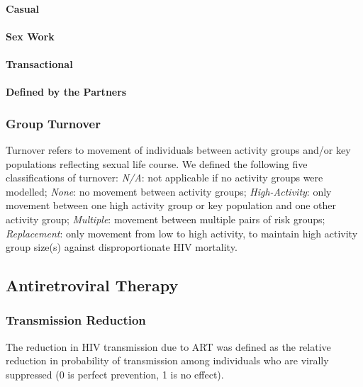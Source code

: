 \paragraph{Casual}
\paragraph{Sex Work}
\paragraph{Transactional}
\paragraph{Defined by the Partners}
\subsubsection{Group Turnover}
\label{aaa:defs:turnover}
Turnover refers to movement of individuals between
activity groups and/or key populations reflecting sexual life course.
We defined the following five classifications of turnover:
\emph{N/A}: not applicable if no activity groups were modelled;
\emph{None}: no movement between activity groups;
\emph{High-Activity}: only movement between one high activity group or key population
  and one other activity group;
\emph{Multiple}: movement between multiple pairs of risk groups;
\emph{Replacement}: only movement from low to high activity,
  to maintain high activity group size(s) against disproportionate HIV mortality.
\subsection{Antiretroviral Therapy}
\subsubsection{Transmission Reduction}
The reduction in HIV transmission due to ART
was defined as the relative reduction in probability of transmission
among individuals who are virally suppressed
(0 is perfect prevention, 1 is no effect).

